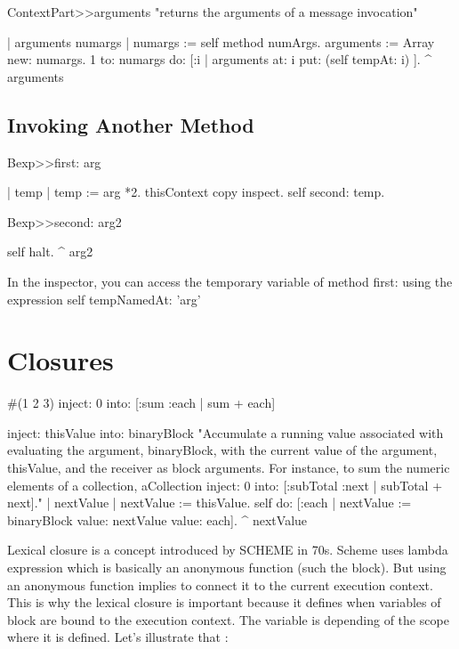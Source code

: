 \documentclass[a4paper,10pt,twoside]{book}
\begin{document}
\begin{code}{}
ContextPart>>arguments
	"returns the arguments of a message invocation"

	| arguments numargs |
	numargs :=  self method numArgs.
	arguments := Array new: numargs.
	1 to: numargs do: [:i | arguments at: i put: (self tempAt: i) ].
	^ arguments
\end{code}


\subsection{Invoking Another Method}
\begin{code}{}
Bexp>>first: arg

	| temp |
	temp := arg *2.
	thisContext copy inspect.
	self second: temp.

Bexp>>second: arg2

	self halt.
	^ arg2
\end{code}

In the inspector, you can access the temporary variable of method first: using the expression self tempNamedAt: 'arg'




\section{Closures}
\begin{code}{}
#(1 2 3) inject: 0 into: [:sum :each | sum + each]
\end{code}

\begin{code}{}
inject: thisValue into: binaryBlock
	"Accumulate a running value associated with evaluating the argument,
	binaryBlock, with the current value of the argument, thisValue, and the
	receiver as block arguments. For instance, to sum the numeric elements of a
	collection, aCollection inject: 0 into: [:subTotal :next | subTotal + next]."
	| nextValue |
	nextValue := thisValue.
	self do: [:each | nextValue := binaryBlock value: nextValue value: each]. 	^ nextValue
\end{code}



Lexical closure is a concept introduced by SCHEME in 70s. Scheme uses lambda expression which is basically an anonymous function (such the block). But using an anonymous function implies to connect it to the current execution context. This is why the lexical closure is important because it defines when variables of block are bound to the execution context. The variable is depending of the scope where it is defined. Let's illustrate that :
\end{document}
